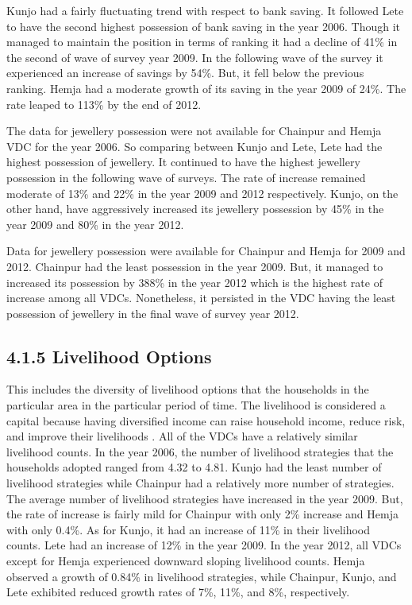 Kunjo had a fairly fluctuating trend with respect to bank saving. It followed Lete to have the second highest possession of bank saving in the year 2006. Though it managed to maintain the position in terms of ranking it had a decline of 41\% in the second of wave of survey year 2009. In the following wave of the survey it experienced an increase of savings by 54\%. But, it fell below the previous ranking. Hemja had a moderate growth of its saving in the year 2009 of 24\%. The rate leaped to 113\% by the end of 2012.     

The data for jewellery possession were not available for Chainpur and Hemja VDC for the year 2006. So comparing between Kunjo and Lete, Lete had the highest possession of jewellery. It continued to have the highest jewellery possession in the following wave of surveys. The rate of increase remained moderate of 13\% and 22\% in the year 2009 and 2012 respectively. Kunjo, on the other hand, have aggressively increased its jewellery possession by 45\% in the year 2009 and 80\% in the year 2012. 

Data for jewellery possession were available for Chainpur and Hemja for 2009 and 2012. Chainpur had the least possession in the year 2009. But, it managed to increased its possession by 388\% in the year 2012 which is the highest rate of increase among all VDCs. Nonetheless, it persisted in the VDC having the least possession of jewellery in the final wave of survey year 2012.  


\subsection*{4.1.5 Livelihood Options} 
This includes the diversity of livelihood options that the households in the particular area in the particular period of time. The livelihood is considered a capital because having diversified income can raise household income, reduce risk, and improve their livelihoods \citep{scoones2013livelihoods}. All of the VDCs have a relatively similar livelihood counts. In the year 2006, the number of livelihood strategies that the households adopted ranged from 4.32 to 4.81. Kunjo had the least number of livelihood strategies while Chainpur had a relatively more number of strategies. The average number of livelihood strategies have increased in the year 2009. But, the rate of increase is fairly mild for Chainpur with only 2\% increase and Hemja with only 0.4\%.  As for Kunjo, it had an increase of 11\% in their livelihood counts. Lete had an increase of 12\% in the year 2009. In the year 2012, all VDCs except for Hemja experienced downward sloping livelihood counts. Hemja observed a growth of 0.84\% in livelihood strategies, while Chainpur, Kunjo, and Lete exhibited reduced growth rates of 7\%, 11\%, and 8\%, respectively. 


